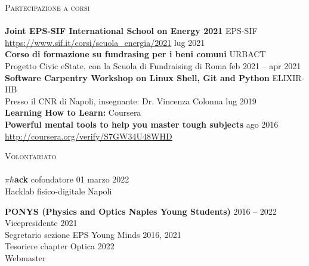 \documentclass[a4paper]{article}
\newcommand{\lineunder} {
  \vspace*{-8pt} \\
  \hspace*{-18pt} \hrulefill \\
}
\newcommand{\header} [1] {
  {\hspace*{-18pt}\vspace*{6pt} \textsc{#1}}
  \vspace*{-6pt} \lineunder
}
\begin{document}
\header{Partecipazione a corsi}
\textbf{Joint EPS-SIF International School on Energy 2021} \hfill EPS-SIF \\
\url{https://www.sif.it/corsi/scuola_energia/2021} \hfill lug 2021 \\
\vspace*{2mm}
\textbf{Corso di formazione su fundrasing per i beni comuni} \hfill URBACT \\
Progetto Civic eState, con la Scuola di Fundraising di Roma \hfill feb 2021 -- apr 2021\\
\vspace*{2mm}
\textbf{Software Carpentry Workshop on Linux Shell, Git and Python} \hfill ELIXIR-IIB\\
Presso il CNR di Napoli, insegnante: Dr. Vincenza Colonna \hfill lug 2019\\
\vspace*{2mm}
\textbf{Learning How to Learn:} \hfill Coursera\\
\textbf{Powerful mental tools to help you master tough subjects} \hfill ago 2016\\
\url{http://coursera.org/verify/S7GW34U48WHD}\\
\vspace*{2mm}

\header{Volontariato}

\(\pi\hbar\)\textbf{ack} cofondatore \hfill 01 marzo 2022 \\
Hacklab fisico-digitale \hfill Napoli \\
\vspace{2mm}

\textbf{PONYS (Physics and Optics Naples Young Students)} \hfill 2016 -- 2022\\
Vicepresidente \hfill 2021\\
Segretario sezione EPS Young Minds \hfill 2016, 2021\\
Tesoriere chapter Optica \hfill 2022\\
Webmaster\\
\vspace{2mm}
\end{document}
